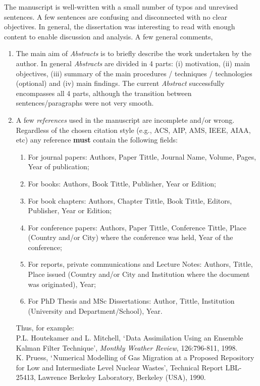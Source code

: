 \documentclass[14pt,twoside]{report}
\begin{document}
The manuscript is well-written with a small number of typos and unrevised sentences. A few sentences are confusing and disconnected with no clear objectives. In general, the dissertation was interesting to read with enough content to enable discussion and analysis. A few general comments,
\begin{enumerate}
\item The main aim of {\it Abstracts} is to briefly describe the work undertaken by the author. In general {\it Abstracts} are divided in 4 parts: (i) motivation, (ii) main objectives, (iii) summary of the main procedures / techniques / technologies (optional) and (iv) main findings. The current {\it Abstract} successfully encompasses all 4 parts, although the transition between sentences/paragraphs were not very smooth.
%
\item A few {\it references} used in the manuscript are incomplete and/or wrong. Regardless of the chosen citation style (e.g., ACS, AIP, AMS, IEEE, AIAA, etc) any reference {\bf must} contain the following fields: 
\begin{enumerate}
\item For journal papers: Authors, Paper Tittle, Journal Name, Volume, Pages, Year of publication;
\item For books: Authors, Book Tittle, Publisher, Year or Edition;
\item For book chapters: Authors, Chapter Tittle, Book Tittle, Editors, Publisher, Year or Edition;
\item For conference papers: Authors, Paper Tittle, Conference Tittle, Place (Country and/or City) where the conference was held, Year of the conference;
\item For reports,  private communications and Lecture Notes: Authors, Tittle, Place issued (Country and/or City and Institution where the document was originated), Year;
\item For PhD Thesis and MSc Dissertations: Author, Tittle, Institution (University and Department/School), Year.
\end{enumerate}  
Thus, for example:\\
\noindent
[39] P.L. Houtekamer and L. Mitchell, $\lq$Data Assimilation Using an Ensemble Kalman Filter Technique', {\it Monthly Weather Review}, 126:796-811, 1998.\\
\noindent
[40] K. Pruess, $\lq$Numerical Modelling of Gas Migration at a Proposed Repository for Low and Intermediate Level Nuclear Wastes', Technical Report LBL-25413, Lawrence Berkeley Laboratory, Berkeley (USA), 1990.\\

\end{enumerate}
\end{document}
